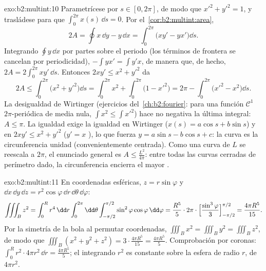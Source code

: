 \begin{solution}{exo:b2:multint:10}
Parametrícese por  $s \in [0, 2\pi]$, de modo que
$x'^2 + y'^2 = 1$, y trasládese para que $\int_0^{2\pi} x(s)\,\dd s =
0$. Por el~\cref{cor:b2:multint:area},
\[
2A = \oint x\,\dd y - y\,\dd x
= \int_0^{2\pi}\bigl(xy' - yx'\bigr)\dd s .
\]
Integrando $\oint y\,\dd x$ por partes sobre el periodo (los términos
de frontera se cancelan por periodicidad), $-\int yx' = \int y'x$, de
manera que, de hecho, $2A = 2\int_0^{2\pi}xy'\,\dd s$. Entonces $2xy'
\leq x^2 + y'^2$ da
\[
2A \leq \int_0^{2\pi}\bigl(x^2 + y'^2\bigr)\dd s
= \int_0^{2\pi} x^2 + \int_0^{2\pi}\bigl(1 - x'^2\bigr)
= 2\pi - \int_0^{2\pi}\bigl(x'^2 - x^2\bigr)\dd s .
\]
La desigualdad de Wirtinger (ejercicios del~\cref{ch:b2:fourier}:
para una función $\mathcal{C}^1$ $2\pi$-periódica de media nula,
$\int x^2 \leq \int x'^2$) hace no negativa la última integral: $A
\leq \pi$. La igualdad exige la igualdad en Wirtinger ($x(s) = a\cos
s + b\sin s$) y en $2xy' \leq x^2 + y'^2$ ($y' = x$ ),
lo que fuerza $y = a\sin s - b\cos s + c$: la curva es la
circunferencia unidad (convenientemente centrada). Como una curva de
 $L$ se reescala a  $2\pi$, el enunciado general es $A
\leq \frac{L^2}{4\pi}$: entre todas las curvas cerradas de perímetro
dado, la circunferencia encierra el mayor .
\end{solution}

\begin{solution}{exo:b2:multint:11}
En coordenadas esféricas, $z = r\sin\varphi$ y $\dd x\,\dd y\,\dd z =
r^2\cos\varphi\,\dd r\,\dd\theta\,\dd\varphi$:
\[
\iiint_B z^2
= \int_0^R r^4\,\dd r\int_0^{2\pi}\dd\theta
\int_{-\pi/2}^{\pi/2}\sin^2\varphi\cos\varphi\,\dd\varphi
= \frac{R^5}5\cdot2\pi\cdot
\Bigl[\frac{\sin^3\varphi}3\Bigr]_{-\pi/2}^{\pi/2}
= \frac{4\pi R^5}{15}.
\]
Por la simetría de la bola al permutar coordenadas, $\iiint_B x^2 =
\iiint_B y^2 = \iiint_B z^2$, de modo que $\iiint_B(x^2 + y^2 + z^2)
= 3\cdot\frac{4\pi R^5}{15} = \frac{4\pi R^5}5$. Comprobación por
coronas: $\int_0^R r^2\cdot 4\pi r^2\,\dd r = \frac{4\pi R^5}5$; el
integrando $r^2$ es constante sobre la esfera de radio $r$, de 
$4\pi r^2$.
\end{solution}

